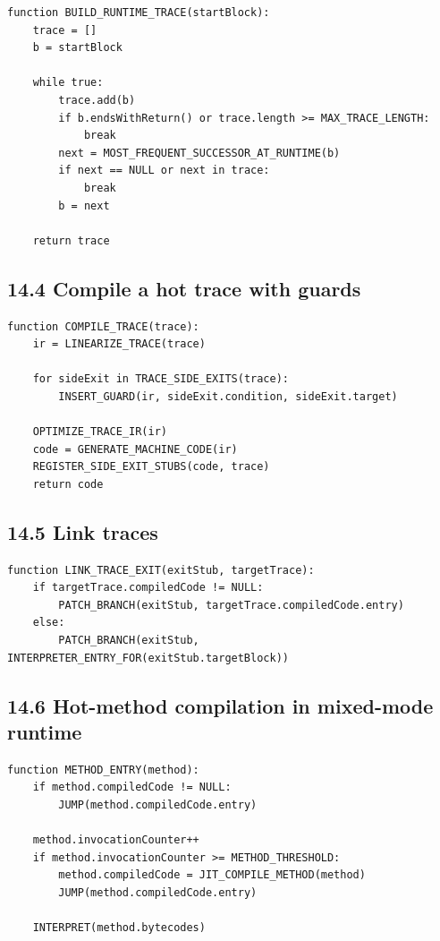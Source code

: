 \documentclass[10pt,letterpaper]{article}
\begin{document}
\begin{verbatim}
function BUILD_RUNTIME_TRACE(startBlock):
    trace = []
    b = startBlock

    while true:
        trace.add(b)
        if b.endsWithReturn() or trace.length >= MAX_TRACE_LENGTH:
            break
        next = MOST_FREQUENT_SUCCESSOR_AT_RUNTIME(b)
        if next == NULL or next in trace:
            break
        b = next

    return trace
\end{verbatim}

\subsection*{14.4 Compile a hot trace with guards}
{}

\begin{verbatim}
function COMPILE_TRACE(trace):
    ir = LINEARIZE_TRACE(trace)

    for sideExit in TRACE_SIDE_EXITS(trace):
        INSERT_GUARD(ir, sideExit.condition, sideExit.target)

    OPTIMIZE_TRACE_IR(ir)
    code = GENERATE_MACHINE_CODE(ir)
    REGISTER_SIDE_EXIT_STUBS(code, trace)
    return code
\end{verbatim}

\subsection*{14.5 Link traces}
{}

\begin{verbatim}
function LINK_TRACE_EXIT(exitStub, targetTrace):
    if targetTrace.compiledCode != NULL:
        PATCH_BRANCH(exitStub, targetTrace.compiledCode.entry)
    else:
        PATCH_BRANCH(exitStub, INTERPRETER_ENTRY_FOR(exitStub.targetBlock))
\end{verbatim}

\subsection*{14.6 Hot-method compilation in mixed-mode runtime}
{}

\begin{verbatim}
function METHOD_ENTRY(method):
    if method.compiledCode != NULL:
        JUMP(method.compiledCode.entry)

    method.invocationCounter++
    if method.invocationCounter >= METHOD_THRESHOLD:
        method.compiledCode = JIT_COMPILE_METHOD(method)
        JUMP(method.compiledCode.entry)

    INTERPRET(method.bytecodes)
\end{verbatim}
\end{document}
